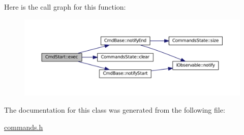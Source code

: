 Here is the call graph for this function\+:
\nopagebreak
\begin{figure}[H]
\begin{center}
\leavevmode
\includegraphics[width=350pt]{class_cmd_start_acf20f86d72982205d1af586b5e09846e_cgraph}
\end{center}
\end{figure}




The documentation for this class was generated from the following file\+:\begin{DoxyCompactItemize}
\item 
\hyperlink{commands_8h}{commands.\+h}\end{DoxyCompactItemize}
